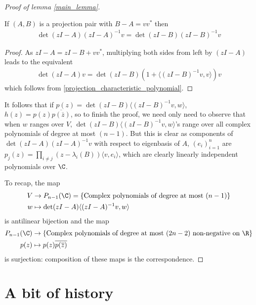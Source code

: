 \begin{proof}[Proof of lemma \ref{main_lemma}]
	\begin{lem}
		If $(A, B)$ is a projection pair with $B - A = v v^{*}$ then
		\begin{align*}
			\det(z I - A) (z I - A)^{-1} v = \det(z I - B) (z I - B)^{-1} v
		\end{align*} 
	\end{lem}
	\begin{proof}
		As $z I - A = z I - B + v v^{*}$, multiplying both sides from left by $(z I - A)$ leads to the equivalent
		\begin{align*}
			\det(z I - A) v = \det(z I - B) (1 + \langle (z I - B)^{-1} v, v \rangle) v
		\end{align*}
		which follows from \ref{projection_characteristic_polynomial}.
	\end{proof}
	It follows that if $p(z) = \det(z I - B) \langle (z I - B)^{-1} v, w \rangle$, $h(z) = p(z) \overline{p (\overline{z})}$, so to finish the proof, we need only need to observe that when $w$ ranges over $V$, $\det(z I - B) \langle (z I - B)^{-1} v, w \rangle$'s range over all complex polynomials of degree at most $(n - 1)$. But this is clear as components of $\det(z I - A)(z I - A)^{-1} v$ with respect to eigenbasis of $A$, $(e_{i})_{i = 1}^{n}$ are $p_{j}(z) = \prod_{i \neq j}(z - \lambda_{i}(B)) \langle v, e_{i} \rangle$, which are clearly linearly independent polynomials over $\C$.

	To recap, the map
	\begin{align*}
		V &\to P_{n - 1}(\C) = \{\text{Complex polynomials of degree at most } (n - 1) \} \\
		w &\mapsto \det(z I - A) \langle (z I - A)^{-1} v, w \rangle
	\end{align*}
	is antilinear bijection and the map
	\begin{align*}
		P_{n - 1}(\C) &\to \{\text{Complex polynomials of degree at most } (2 n - 2) \text{ non-negative on } \R \} \\
		p(z) &\mapsto p(z) \overline{p(\overline{z})}
	\end{align*}
	is surjection: composition of these maps is the correspondence.
\end{proof}

\section{A bit of history}


